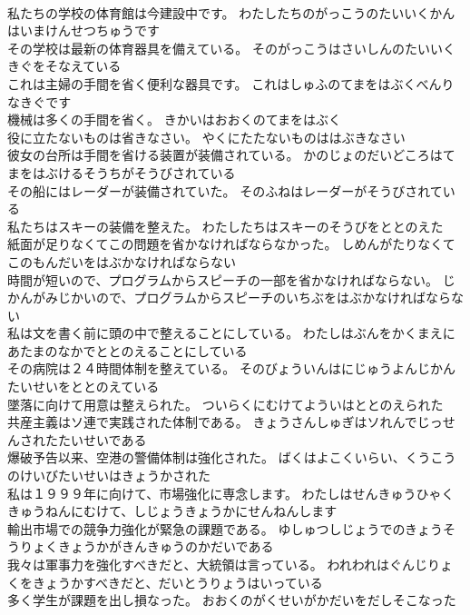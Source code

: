 \documentclass[8pt]{extreport}
\begin{document}
\begin{CJK}{UTF8}{min}
\\	私たちの学校の体育館は今建設中です。	わたしたちのがっこうのたいいくかんはいまけんせつちゅうです 
\\	その学校は最新の体育器具を備えている。	そのがっこうはさいしんのたいいくきぐをそなえている 
\\	これは主婦の手間を省く便利な器具です。	これはしゅふのてまをはぶくべんりなきぐです 
\\	機械は多くの手間を省く。	きかいはおおくのてまをはぶく 
\\	役に立たないものは省きなさい。	やくにたたないものははぶきなさい 
\\	彼女の台所は手間を省ける装置が装備されている。	かのじょのだいどころはてまをはぶけるそうちがそうびされている 
\\	その船にはレーダーが装備されていた。	そのふねはレーダーがそうびされている 
\\	私たちはスキーの装備を整えた。	わたしたちはスキーのそうびをととのえた 
\\	紙面が足りなくてこの問題を省かなければならなかった。	しめんがたりなくてこのもんだいをはぶかなければならない 
\\	時間が短いので、プログラムからスピーチの一部を省かなければならない。	じかんがみじかいので、プログラムからスピーチのいちぶをはぶかなければならない 
\\	私は文を書く前に頭の中で整えることにしている。	わたしはぶんをかくまえにあたまのなかでととのえることにしている 
\\	その病院は２４時間体制を整えている。	そのびょういんはにじゅうよんじかんたいせいをととのえている 
\\	墜落に向けて用意は整えられた。	ついらくにむけてよういはととのえられた 
\\	共産主義はソ連で実践された体制である。	きょうさんしゅぎはソれんでじっせんされたたいせいである 
\\	爆破予告以来、空港の警備体制は強化された。	ばくはよこくいらい、くうこうのけいびたいせいはきょうかされた 
\\	私は１９９９年に向けて、市場強化に専念します。	わたしはせんきゅうひゃくきゅうねんにむけて、しじょうきょうかにせんねんします 
\\	輸出市場での競争力強化が緊急の課題である。	ゆしゅつしじょうでのきょうそうりょくきょうかがきんきゅうのかだいである 
\\	我々は軍事力を強化すべきだと、大統領は言っている。	われわれはぐんじりょくをきょうかすべきだと、だいとうりょうはいっている 
\\	多く学生が課題を出し損なった。	おおくのがくせいがかだいをだしそこなった 

\end{CJK}
\end{document}
